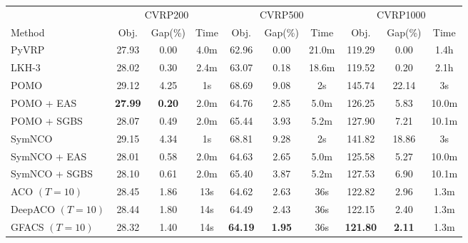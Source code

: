 \begin{tabular}{lccccccccc}
\toprule[1.0pt]
\multicolumn{1}{c}{} & \multicolumn{3}{c}{CVRP200} & \multicolumn{3}{c}{CVRP500} &
\multicolumn{3}{c}{CVRP1000} 
\\ 
\cmidrule[0.5pt](lr{0.2em}){2-4}
\cmidrule[0.5pt](lr{0.2em}){5-7}
\cmidrule[0.5pt](lr{0.2em}){8-10}
Method
 & Obj. & Gap(\%)
 & Time & Obj. & Gap(\%) & Time
 & Obj. & Gap(\%) & Time 
\\ 
\midrule[1.0pt]
PyVRP & 27.93 & 0.00 & 4.0m & 62.96 & 0.00 & 21.0m & 119.29 & 0.00 & 1.4h \\ 
LKH-3 & 28.02 & 0.30 & 2.4m & 63.07 & 0.18 & 18.6m & 119.52 & 0.20 & 2.1h 
\\
\cmidrule(lr{0.1em}){1-1}
\cmidrule(lr{0.1em}){2-4}
\cmidrule(lr{0.1em}){5-7}
\cmidrule(lr{0.1em}){8-10}
POMO & 29.12 & 4.25 & 1s & 68.69 & 9.08 & 2s & 145.74 & 22.14 & 3s
\\
POMO + EAS & \textbf{27.99} & \textbf{0.20} & 2.0m & 64.76 & 2.85 & 5.0m & 126.25 & 5.83 & 10.0m
\\
POMO + SGBS & 28.07 & 0.49 & 2.0m & 65.44 & 3.93 & 5.2m & 127.90 & 7.21 & 10.1m  
\\
SymNCO  & 29.15 & 4.34 & 1s & 68.81 & 9.28 & 2s & 141.82 & 18.86 & 3s 
\\
SymNCO + EAS & 28.01 & 0.58 & 2.0m & 64.63 & 2.65 & 5.0m & 125.58 & 5.27 & 10.0m 
\\
SymNCO + SGBS  & 28.10 & 0.61 & 2.0m & 65.40 & 3.87 & 5.2m & 127.53 & 6.90 & 10.1m 
\\
\cmidrule(lr{0.1em}){1-1}
\cmidrule(lr{0.1em}){2-4}
\cmidrule(lr{0.1em}){5-7}
\cmidrule(lr{0.1em}){8-10}
ACO {$(T = 10)$} & 28.45 & 1.86 & 13s & 64.62 & 2.63 & 36s & 122.82 & 2.96 & 1.3m 
\\
DeepACO {$(T = 10)$} & 28.44 & 1.80 & 14s & 64.49 & 2.43 & 36s & 122.15 & 2.40 & 1.3m
\\
GFACS {$(T = 10)$} & 28.32 & 1.40 & 14s & \textbf{64.19} & \textbf{1.95} & 36s & \textbf{121.80} & \textbf{2.11} & 1.3m
\\
\bottomrule[1.0pt]
\end{tabular}
